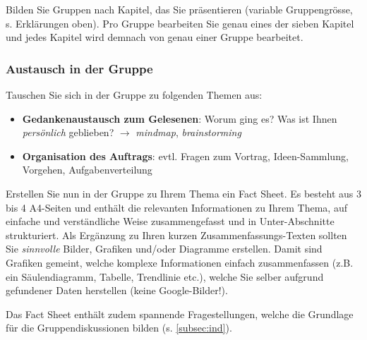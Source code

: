 Bilden Sie Gruppen nach Kapitel, das Sie präsentieren (variable Gruppengrösse, s. Erklärungen oben). Pro Gruppe bearbeiten Sie genau eines der sieben Kapitel und jedes Kapitel wird demnach von genau einer Gruppe bearbeitet.

\subsubsection*{Austausch in der Gruppe}
Tauschen Sie sich in der Gruppe zu folgenden Themen aus:

\begin{itemize}
	\item \textbf{Gedankenaustausch zum Gelesenen}: Worum ging es? Was ist Ihnen \textit{persönlich} geblieben? $\rightarrow$ \textit{mindmap}, \textit{brainstorming}
	\item \textbf{Organisation des Auftrags}: evtl. Fragen zum Vortrag, Ideen-Sammlung, Vorgehen, Aufgabenverteilung
\end{itemize}

Erstellen Sie nun in der Gruppe zu Ihrem Thema ein Fact Sheet. Es besteht aus 3 bis 4 A4-Seiten und enthält die relevanten Informationen zu Ihrem Thema, auf einfache und verständliche Weise zusammengefasst und in Unter-Abschnitte strukturiert. Als Ergänzung zu Ihren kurzen Zusammenfassungs-Texten sollten Sie \textit{sinnvolle} Bilder, Grafiken und/oder Diagramme erstellen. Damit sind Grafiken gemeint, welche komplexe Informationen einfach zusammenfassen (z.B. ein Säulendiagramm, Tabelle, Trendlinie etc.), welche Sie selber aufgrund gefundener Daten herstellen (keine Google-Bilder!).

Das Fact Sheet enthält zudem spannende Fragestellungen, welche die Grundlage für die Gruppendiskussionen bilden (s. \cref{subsec:ind}).

